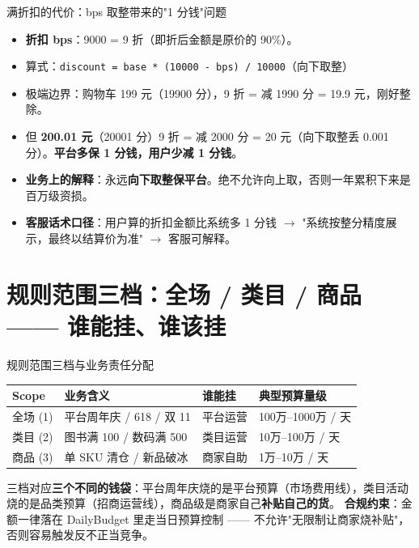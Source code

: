 \documentclass[aspectratio=169,11pt]{beamer}
\begin{document}
\begin{frame}[shrink]{满折扣的代价：bps 取整带来的"1 分钱"问题}
\begin{itemize}
  \item \textbf{折扣 bps}：9000 = 9 折（即折后金额是原价的 90\%）。
  \item 算式：\texttt{discount = base * (10000 - bps) / 10000}（向下取整）
  \item 极端边界：购物车 199 元（19900 分），9 折 = 减 1990 分 = 19.9 元，刚好整除。
  \item 但 \textbf{200.01 元}（20001 分）9 折 = 减 2000 分 = 20 元（向下取整丢 0.001 分）。\textbf{平台多保 1 分钱，用户少减 1 分钱}。
  \item \textbf{业务上的解释}：永远\textbf{向下取整保平台}。绝不允许向上取，否则一年累积下来是百万级资损。
  \item \textbf{客服话术口径}：用户算的折扣金额比系统多 1 分钱 $\to$ "系统按整分精度展示，最终以结算价为准" $\to$ 客服可解释。
\end{itemize}
\end{frame}

\section{规则范围三档：全场 / 类目 / 商品 —— 谁能挂、谁该挂}

\begin{frame}[shrink]{规则范围三档与业务责任分配}
\begin{tabular}{@{}llll@{}}
\toprule
Scope & 业务含义 & 谁能挂 & 典型预算量级 \\
\midrule
全场 (1) & 平台周年庆 / 618 / 双 11 & 平台运营 & 100万--1000万 / 天 \\
类目 (2) & 图书满 100 / 数码满 500 & 类目运营 & 10万--100万 / 天 \\
商品 (3) & 单 SKU 清仓 / 新品破冰 & 商家自助 & 1万--10万 / 天 \\
\bottomrule
\end{tabular}
\vspace{2mm}
\small 三档对应\textbf{三个不同的钱袋}：平台周年庆烧的是平台预算（市场费用线），类目活动烧的是品类预算（招商运营线），商品级是商家自己\textbf{补贴自己的货}。
\textbf{合规约束}：金额一律落在 DailyBudget 里走当日预算控制 —— 不允许"无限制让商家烧补贴"，否则容易触发反不正当竞争。
\end{frame}
\end{document}

